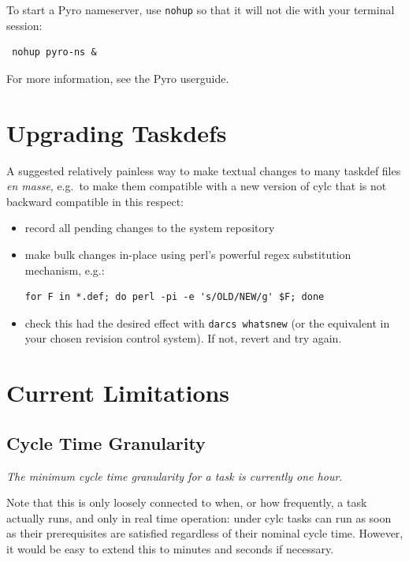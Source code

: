 \documentclass[11pt,a4paper]{article}
\begin{document}
To start a Pyro nameserver, use \lstinline{nohup} so that it
will not die with your terminal session: 

\begin{lstlisting}
 nohup pyro-ns &
\end{lstlisting}

For more information, see the Pyro userguide.


\pagebreak
\section{Upgrading Taskdefs}

A suggested relatively painless way to make textual changes to many
taskdef files {\em en masse}, e.g.\ to make them compatible with a new
version of cylc that is not backward compatible in this respect:

\begin{itemize}
    \item record all pending changes to the system repository
    \item make bulk changes in-place using perl's powerful regex 
       substitution mechanism, e.g.:
       \begin{lstlisting}
for F in *.def; do perl -pi -e 's/OLD/NEW/g' $F; done
       \end{lstlisting}
   \item check this had the desired effect with 
       \lstinline=darcs whatsnew= (or the equivalent in your chosen
       revision control system). If not, revert and try again.
\end{itemize}


\pagebreak
\section{Current Limitations}

\subsection{Cycle Time Granularity}

{\em The minimum cycle time granularity for a task is currently one hour}.

Note that this is only loosely connected to when, or how frequently, a
task actually runs, and only in real time operation: under cylc tasks
can run as soon as their prerequisites are satisfied regardless of their
nominal cycle time. However, it would be easy to extend this to minutes
and seconds if necessary.  
\end{document}
